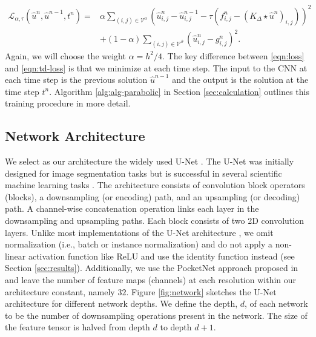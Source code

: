 \documentclass[preprint,12pt]{elsarticle}
\begin{document}
\begin{align} \label{eqn:td-loss}
    \mathcal{L}_{\alpha, \tau}(\hat{u}^n, \hat{u}^{n-1}, t^n) = & \alpha \sum_{(i,j) \in \mathcal{V}^0} \left(\hat{u}^n_{i,j} - \hat{u}^{n-1}_{i,j} - \tau\left(f_{i,j}^n - \left(K_{\Delta} \star \hat{u}^n\right)_{i,j}\right)\right)^2  \nonumber\\
    & + (1 - \alpha) \sum_{(i,j) \in \mathcal{V}^\partial} \left(\hat{u}^n_{i,j} - g_{i,j}^n\right)^2.
\end{align}
Again, we will choose the weight $\alpha = h^2 / 4$. The key difference between \eqref{eqn:loss} and \eqref{eqn:td-loss} is that we minimize at each time step. The input to the CNN at each time step is the previous solution $\hat{u}^{n-1}$ and the output is the solution at the time step $t^n$. Algorithm \ref{alg:alg-parabolic} in Section \ref{sec:calculation} outlines this training procedure in more detail.

\subsection{Network Architecture} \label{sec:architecture}
We select as our architecture the widely used U-Net \cite{unet}. The U-Net was initially designed for image segmentation tasks but is successful in several scientific machine learning tasks \cite{gravity1, gravity2, joint-inversion}. The architecture consists of convolution block operators (blocks), a downsampling (or encoding) path, and an upsampling (or decoding) path. A channel-wise concatenation operation links each layer in the downsampling and upsampling paths. Each block consists of two 2D convolution layers.  Unlike most implementations of the U-Net architecture \cite{unet, unet-3d, nnunet}, we omit normalization (i.e., batch or instance normalization) and do not apply a non-linear activation function like ReLU and use the identity function instead (see Section \ref{sec:results}). Additionally, we use the PocketNet approach proposed in \cite{celaya2022pocketnet} and leave the number of feature maps (channels) at each resolution within our architecture constant, namely $32$.  Figure \ref{fig:network} sketches the U-Net architecture for different network depths. We define the depth, $d$, of each network to be the number of downsampling operations present in the network. The size of the feature tensor is halved from depth $d$ to depth $d+1$. %
\end{document}
